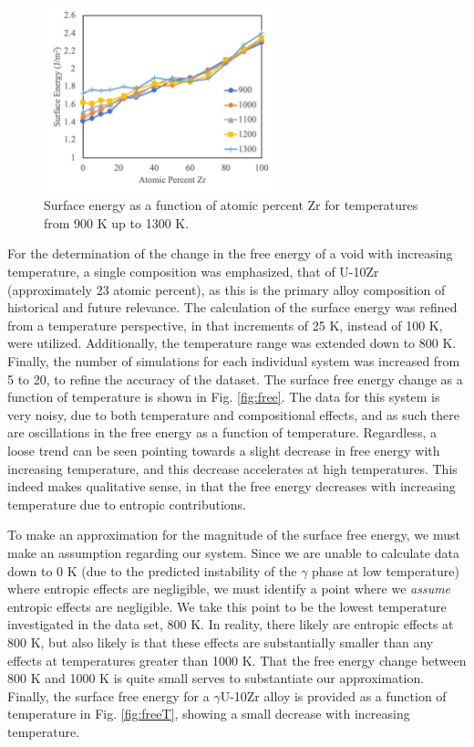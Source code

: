 \documentclass[review]{elsarticle}
\begin{document}
\begin{figure}[!htp]
\begin{center}
\includegraphics[width=0.6\textwidth]{Esurf}
\end{center}
\caption{Surface energy as a function of atomic percent Zr for temperatures from 900 K up to 1300 K.}
\label{fig:Esurf}
\end{figure}

\FloatBarrier

For the determination of the change in the free energy of a void with increasing temperature, a single composition was emphasized, that of U-10Zr (approximately 23 atomic percent), as this is the primary alloy composition of historical and future relevance. The calculation of the surface energy was refined from a temperature perspective, in that increments of 25 K, instead of 100 K, were utilized. Additionally, the temperature range was extended down to 800 K. Finally, the number of simulations for each individual system was increased from 5 to 20, to refine the accuracy of the dataset. The surface free energy change as a function of temperature is shown in Fig. \ref{fig:free}. The data for this system is very noisy, due to both temperature and compositional effects, and as such there are oscillations in the free energy as a function of temperature. Regardless, a loose trend can be seen pointing towards a slight decrease in free energy with increasing temperature, and this decrease accelerates at high temperatures. This indeed makes qualitative sense, in that the free energy decreases with increasing temperature due to entropic contributions. 

To make an approximation for the magnitude of the surface free energy, we must make an assumption regarding our system. Since we are unable to calculate data down to 0 K (due to the predicted instability of the $\gamma$ phase at low temperature) where entropic effects are negligible, we must identify a point where we \textit{assume} entropic effects are negligible. We take this point to be the lowest temperature investigated in the data set, 800 K. In reality, there likely are entropic effects at 800 K, but also likely is that these effects are substantially smaller than any effects at temperatures greater than 1000 K. That the free energy change between 800 K and 1000 K is quite small serves to substantiate our approximation. Finally, the surface free energy for a $\gamma$U-10Zr alloy is provided as a function of temperature in Fig. \ref{fig:freeT}, showing a small decrease with increasing temperature. 
\end{document}
